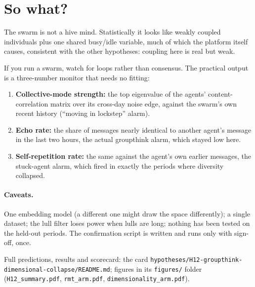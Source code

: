 \documentclass[aps,pre,reprint,10pt,nofootinbib]{revtex4-2}
\begin{document}
\section{So what?}
The swarm is not a hive mind. Statistically it looks like weakly coupled individuals plus one shared busy/idle variable, much of which the platform itself causes, consistent with the other hypotheses: coupling here is real but weak.

If you run a swarm, watch for loops rather than consensus. The practical output is a three-number monitor that needs no fitting:
\begin{enumerate}
\item \textbf{Collective-mode strength:} the top eigenvalue of the agents' content-correlation matrix over its cross-day noise edge, against the swarm's own recent history (``moving in lockstep'' alarm).
\item \textbf{Echo rate:} the share of messages nearly identical to another agent's message in the last two hours, the actual groupthink alarm, which stayed low here.
\item \textbf{Self-repetition rate:} the same against the agent's own earlier messages, the stuck-agent alarm, which fired in exactly the periods where diversity collapsed.
\end{enumerate}

\paragraph{Caveats.} One embedding model (a different one might draw the space differently); a single dataset; the lull filter loses power when lulls are long; nothing has been tested on the held-out periods. The confirmation script is written and runs only with sign-off, once.

\medskip
{\footnotesize Full predictions, results and scorecard: the card \texttt{hypotheses/H12-groupthink-dimensional-collapse/README.md}; figures in its \texttt{figures/} folder (\texttt{H12\_summary.pdf}, \texttt{rmt\_arm.pdf}, \texttt{dimensionality\_arm.pdf}).}
\end{document}
